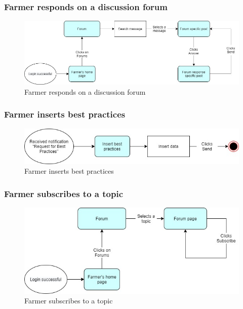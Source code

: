 \documentclass{article}
\begin{document}
        \subsubsection{Farmer responds on a discussion forum}
            \begin{figure} [h]
                \centering
                \includegraphics[width=1\textwidth]{images/UserInterfaces/MapsFunctionalities/9. FarmerRespondsOnForum.jpg}
                \caption{\label{fig:FarmerRespondsForum}Farmer responds on a discussion forum}
            \end{figure}
            
            
        \subsubsection{Farmer inserts best practices}
            \begin{figure} [h]
                \centering
                \includegraphics[width=1\textwidth]{images/UserInterfaces/MapsFunctionalities/12. FarmerInsertsBestPractices.jpg}
                \caption{\label{fig:FarmerInsertBestPractice}Farmer inserts best practices}
            \end{figure}
    
        \newpage
        
        \subsubsection{Farmer subscribes to a topic}
            \begin{figure} [h]
                \centering
                \includegraphics[width=1\textwidth]{images/UserInterfaces/MapsFunctionalities/10. FarmerSubscribesTopic.jpg}
                \caption{\label{fig:FarmerSubscribesTopic}Farmer subscribes to a topic}
            \end{figure}
        
\end{document}
